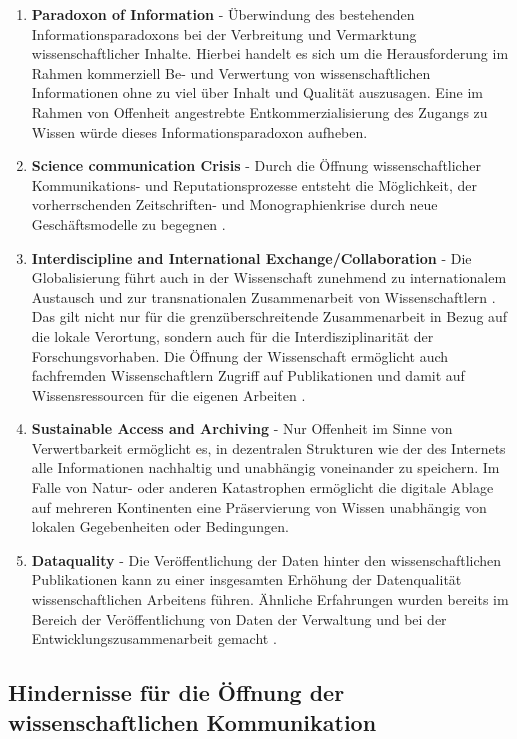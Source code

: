 \begin{enumerate}
\item \textbf{Paradoxon of Information} - Überwindung des bestehenden Informationsparadoxons bei der Verbreitung und Vermarktung wissenschaftlicher Inhalte. Hierbei handelt es sich um die Herausforderung im Rahmen kommerziell Be- und Verwertung von wissenschaftlichen Informationen ohne zu viel über Inhalt und Qualität auszusagen. Eine im Rahmen von Offenheit angestrebte Entkommerzialisierung des Zugangs zu Wissen würde dieses Informationsparadoxon aufheben.
\item \textbf{Science communication Crisis} - Durch die Öffnung wissenschaftlicher Kommunikations- und Reputationsprozesse entsteht die Möglichkeit, der vorherrschenden Zeitschriften- und Monographienkrise durch neue Geschäftsmodelle zu begegnen \cite{muller_2010_open} \cite{naeder_2010_open}.
\item \textbf{Interdiscipline and International Exchange/Collaboration} - Die Globalisierung führt auch in der Wissenschaft zunehmend zu internationalem Austausch und zur transnationalen Zusammenarbeit von Wissenschaftlern \cite{Waltman_2011}. Das gilt nicht nur für die grenzüberschreitende Zusammenarbeit in Bezug auf die lokale Verortung, sondern auch für die Interdisziplinarität der Forschungsvorhaben. Die Öffnung der Wissenschaft ermöglicht auch fachfremden Wissenschaftlern Zugriff auf Publikationen und damit auf Wissensressourcen für die eigenen Arbeiten \cite{suchen}.
\item \textbf{Sustainable Access and Archiving} - Nur Offenheit im Sinne von Verwertbarkeit ermöglicht es, in dezentralen Strukturen wie der des Internets alle Informationen nachhaltig und unabhängig voneinander zu speichern. Im Falle von Natur- oder anderen Katastrophen ermöglicht die digitale Ablage auf mehreren Kontinenten eine Präservierung von Wissen unabhängig von lokalen Gegebenheiten oder Bedingungen.
\item \textbf{Dataquality} - Die Veröffentlichung der Daten hinter den wissenschaftlichen Publikationen kann zu einer insgesamten Erhöhung der Datenqualität wissenschaftlichen Arbeitens führen. Ähnliche Erfahrungen wurden bereits im Bereich der Veröffentlichung von Daten der Verwaltung und bei der Entwicklungszusammenarbeit gemacht \cite{heise_2014_bundestag}.
\end{enumerate}

\subsection{Hindernisse für die Öffnung der wissenschaftlichen Kommunikation}

